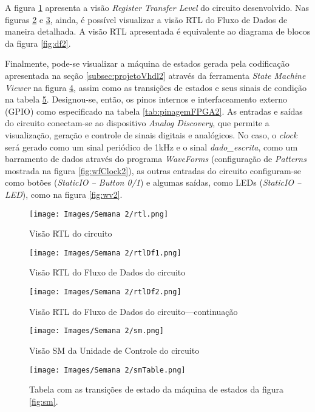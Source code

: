 \documentclass[amsmath,amssymb,floatfix]{report}
\begin{document}
A figura \ref{fig:rtl2} apresenta a visão \textit{Register Transfer Level} do circuito desenvolvido. Nas figuras \ref{fig:rtlDf12} e \ref{fig:rtlDf22}, ainda, é possível visualizar a visão RTL do Fluxo de Dados de maneira detalhada. A visão RTL apresentada é equivalente ao diagrama de blocos da figura \ref{fig:df2}. 

Finalmente, pode-se visualizar a máquina de estados gerada pela codificação apresentada na seção \ref{subsec:projetoVhdl2} através da ferramenta \textit{State Machine Viewer} na figura \ref{fig:sm2}, assim como as transições de estados e seus sinais de condição na tabela \ref{fig:smTable2}. Designou-se, então, os pinos internos e interfaceamento externo (GPIO) como especificado na tabela \ref{tab:pinagemFPGA2}. As entradas e saídas do circuito conectam-se ao dispositivo \textit{Analog Discovery}, que permite a visualização, geração e controle de sinais digitais e analógicos. No caso, o \textit{clock} será gerado como um sinal periódico de 1kHz  e o sinal \textit{dado\_escrita}, como um barramento de dados através do programa \textit{WaveForms} (configuração de \textit{Patterns} mostrada na figura \ref{fig:wfClock2}), as outras entradas do circuito configuram-se como botões (\textit{StaticIO -- Button 0/1}) e algumas saídas, como LEDs (\textit{StaticIO -- LED}), como na figura \ref{fig:wv2}.

\begin{figure}[H]
\centering
\texttt{[image: Images/Semana 2/rtl.png]} 
    \caption{Visão RTL do circuito}
    \label{fig:rtl2}
\end{figure} 

\begin{figure}[H]
\centering
\texttt{[image: Images/Semana 2/rtlDf1.png]} 
    \caption{Visão RTL do Fluxo de Dados do circuito}
    \label{fig:rtlDf12}
\end{figure} 

\begin{figure}[H]
\centering
\texttt{[image: Images/Semana 2/rtlDf2.png]} 
    \caption{Visão RTL do Fluxo de Dados do circuito---continuação}
    \label{fig:rtlDf22}
\end{figure} 

\begin{figure}[H]
\centering
\texttt{[image: Images/Semana 2/sm.png]} 
    \caption{Visão SM da Unidade de Controle do circuito}
    \label{fig:sm2}
\end{figure} 

\begin{figure}[H]
\centering
\texttt{[image: Images/Semana 2/smTable.png]} 
    \caption{Tabela com as transições de estado da máquina de estados da figura \ref{fig:sm}.}
    \label{fig:smTable2}
\end{figure} 
\end{document}
